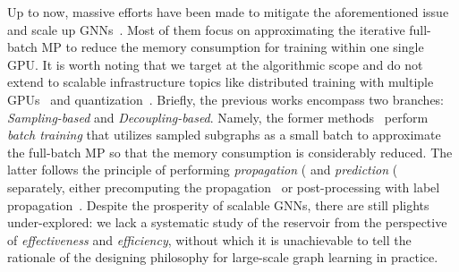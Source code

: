 \message{ !name(main.tex)}\documentclass{article}
\begin{document}
Up to now, massive efforts have been made to mitigate the aforementioned issue and scale up GNNs~\citep{chiang2019cluster, zeng2019graphsaint, hamilton2017inductive, chen2018fastgcn, zou2019layer, wu2019simplifying, frasca2020sign, sun2021scalable, zhang2021graph}. Most of them focus on approximating the iterative full-batch MP to reduce the memory consumption for training within one single GPU. It is worth noting that we target at the algorithmic scope and do not extend to scalable infrastructure topics like distributed training with multiple GPUs~\citep{bojchevski2020scaling,md2021distgnn} and quantization~\citep{liu2021exact}. Briefly, the previous works encompass two branches: \textit{Sampling-based} and \textit{Decoupling-based}. Namely, the former methods~\citep{hamilton2017inductive, chen2018fastgcn, zeng2019graphsaint, chiang2019cluster, chen2017stochastic, cong2020minimal, huang2018adaptive} perform \textit{batch training} that utilizes sampled
subgraphs as a small batch to approximate the full-batch MP so that the memory consumption is considerably reduced. The latter follows the principle of performing \textit{propagation} ( and \textit{prediction} ( separately, either precomputing the propagation~\citep{wu2019simplifying, frasca2020sign, klicpera2018predict, liu2022neighbor2seq, bojchevski2020scaling} or post-processing with label propagation~\citep{sun2021scalable, huang2020combining}. Despite the prosperity of scalable GNNs, there are still plights under-explored:
we lack a systematic study of the reservoir from the perspective of \textit{effectiveness} and \textit{efficiency}, without which it is unachievable to tell the rationale of the designing philosophy for large-scale graph learning in practice.
\end{document}
